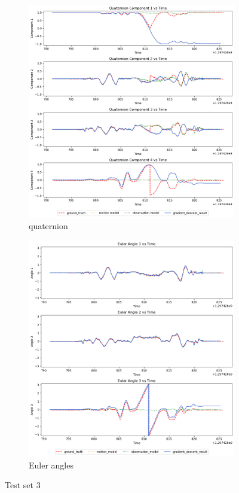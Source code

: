 \documentclass[conference]{IEEEtran}
\begin{document}
\begin{figure}[h]
    \centering
    \begin{subfigure}{0.4\textwidth}
        \includegraphics[width=\linewidth]{../img/3_qt.png}
        \caption{quaternion}
    \end{subfigure}
    \hfill
    \begin{subfigure}{0.4\textwidth}
        \includegraphics[width=\linewidth]{../img/3_ea.png}
        \caption{Euler angles}
    \end{subfigure}
    \caption{Test set 3}
    \label{fig:set3}
\end{figure}
\end{document}
